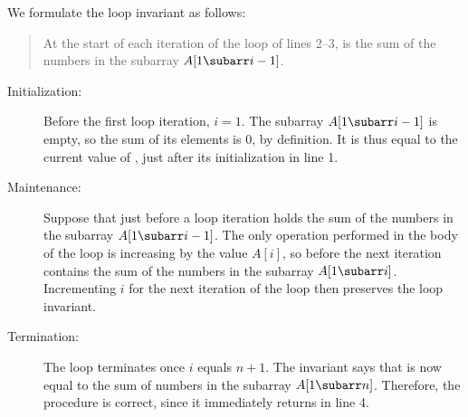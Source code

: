 We formulate the loop invariant as follows:
\begin{quote}
    At the start of each iteration of the  loop of lines 2--3,  is the sum of the numbers in the subarray $A[1\subarr i-1]$.
\end{quote}

\begin{description}
    \item[Initialization:] Before the first loop iteration, $i=1$.
    The subarray $A[1\subarr i-1]$ is empty, so the sum of its elements is 0, by definition.
    It is thus equal to the current value of , just after its initialization in line 1.
    \item[Maintenance:] Suppose that just before a loop iteration  holds the sum of the numbers in the subarray $A[1\subarr i-1]$.
    The only operation performed in the body of the loop is increasing  by the value $A[i]$, so before the next iteration  contains the sum of the numbers in the subarray $A[1\subarr i]$.
    Incrementing $i$ for the next iteration of the loop then preserves the loop invariant.
    \item[Termination:] The loop terminates once $i$ equals $n+1$.
    The invariant says that  is now equal to the sum of numbers in the subarray $A[1\subarr n]$.
    Therefore, the procedure is correct, since it immediately returns  in line 4.
\end{description}
